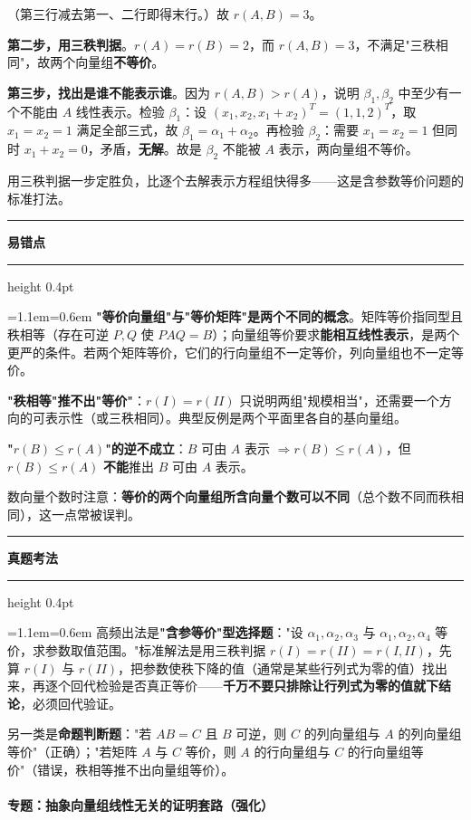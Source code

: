 \documentclass[11pt,openany,UTF8]{ctexbook}
\newcommand{\callouthead}[2]{%
  \par\addvspace{7pt}\noindent
  {\color{#1}\rule[-0.15em]{3pt}{1.05em}}\hspace{0.5em}%
  {\bfseries\color{#1}#2}\par\nobreak\vspace{-0.35em}%
  {\color{rulesep}\hrule height 0.4pt}\nobreak\vspace{0.45em}%
  \begingroup\small\setlength{\parindent}{0pt}%
  \leftskip=1.1em\rightskip=0.6em\noindent\ignorespaces}
\newcommand{\calloutend}{\par\endgroup\addvspace{7pt}}
\newenvironment{callwarn}[1]{\callouthead{warnbar}{#1}}{\calloutend}
\newenvironment{callexam}[1]{\callouthead{exambar}{#1}}{\calloutend}
\begin{document}
（第三行减去第一、二行即得末行。）故 $r(A,B)=3$。

\textbf{第二步，用三秩判据}。$r(A)=r(B)=2$，而 $r(A,B)=3$，不满足"三秩相同"，故两个向量组\textbf{不等价}。

\textbf{第三步，找出是谁不能表示谁}。因为 $r(A,B)>r(A)$，说明 $\beta_1,\beta_2$ 中至少有一个不能由 $A$ 线性表示。检验 $\beta_1$：设 $(x_1,x_2,x_1+x_2)^T=(1,1,2)^T$，取 $x_1=x_2=1$ 满足全部三式，故 $\beta_1=\alpha_1+\alpha_2$。再检验 $\beta_2$：需要 $x_1=x_2=1$ 但同时 $x_1+x_2=0$，矛盾，\textbf{无解}。故是 $\beta_2$ 不能被 $A$ 表示，两向量组不等价。

用三秩判据一步定胜负，比逐个去解表示方程组快得多——这是含参数等价问题的标准打法。

\begin{callwarn}{易错点}
\textbf{"等价向量组"与"等价矩阵"是两个不同的概念}。矩阵等价指同型且秩相等（存在可逆 $P,Q$ 使 $PAQ=B$）；向量组等价要求\textbf{能相互线性表示}，是两个更严的条件。若两个矩阵等价，它们的行向量组不一定等价，列向量组也不一定等价。

\textbf{"秩相等"推不出"等价"}：$r(I)=r(II)$ 只说明两组"规模相当"，还需要一个方向的可表示性（或三秩相同）。典型反例是两个平面里各自的基向量组。

\textbf{"$r(B)\le r(A)$"的逆不成立}：$B$ 可由 $A$ 表示 $\Rightarrow r(B)\le r(A)$，但 $r(B)\le r(A)$ \textbf{不能}推出 $B$ 可由 $A$ 表示。

数向量个数时注意：\textbf{等价的两个向量组所含向量个数可以不同}（总个数不同而秩相同），这一点常被误判。

\end{callwarn}

\begin{callexam}{真题考法}
高频出法是\textbf{"含参等价"型选择题}："设 $\alpha_1,\alpha_2,\alpha_3$ 与 $\alpha_1,\alpha_2,\alpha_4$ 等价，求参数取值范围。"标准解法是用三秩判据 $r(I)=r(II)=r(I,II)$，先算 $r(I)$ 与 $r(II)$，把参数使秩下降的值（通常是某些行列式为零的值）找出来，再逐个回代检验是否真正等价——\textbf{千万不要只排除让行列式为零的值就下结论}，必须回代验证。

另一类是\textbf{命题判断题}："若 $AB=C$ 且 $B$ 可逆，则 $C$ 的列向量组与 $A$ 的列向量组等价"（正确）；"若矩阵 $A$ 与 $C$ 等价，则 $A$ 的行向量组与 $C$ 的行向量组等价"（错误，秩相等推不出向量组等价）。

\end{callexam}

\paragraph{专题：抽象向量组线性无关的证明套路（强化）}\mbox{}{\par}
\end{document}
